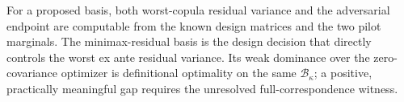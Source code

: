 For a proposed basis, both worst-copula residual variance and the adversarial endpoint are computable from the known design matrices and the two pilot marginals.  The minimax-residual basis is the design decision that directly controls the worst ex ante residual variance.  Its weak dominance over the zero-covariance optimizer is definitional optimality on the same \(\mathcal B_\kappa\); a positive, practically meaningful gap requires the unresolved full-correspondence witness.